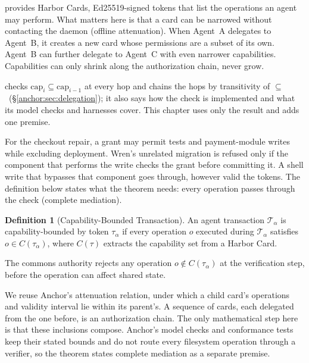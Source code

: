 \documentclass[11pt,a4paper]{article}
\theoremstyle{definition}
\newtheorem{definition}{Definition}[section]
\theoremstyle{remark}
\begin{document}
 provides Harbor Cards, Ed25519-signed tokens that list the operations an agent may perform. What matters here is that a card can be narrowed without contacting the daemon (offline attenuation). When Agent~A delegates to Agent~B, it creates a new card whose permissions are a subset of its own. Agent~B can further delegate to Agent~C with even narrower capabilities. Capabilities can only shrink along the authorization chain, never grow.

 checks $\mathrm{cap}_i \subseteq \mathrm{cap}_{i-1}$ at every hop and chains the hops by transitivity of $\subseteq$\ifpdbook\ (\S\ref{anchor:sec:delegation})\fi; it also says how the check is implemented and what its model checks and harnesses cover. This chapter uses only the result and adds one premise.

For the checkout repair, a grant may permit tests and payment-module writes
while excluding deployment. Wren's unrelated migration is refused only if the
component that performs the write checks the grant before committing it. A
shell write that bypasses that component goes through, however valid the
tokens. The definition below states what the theorem needs: every operation
passes through the check (complete mediation).

\begin{definition}[Capability-Bounded Transaction]\label{def:cap-txn}
\setlength{\parskip}{4pt plus 1pt}
An agent transaction $\mathcal{T}_\alpha$ is capability-bounded by token $\tau_\alpha$ if every operation $o$ executed during $\mathcal{T}_\alpha$ satisfies $o \in C(\tau_\alpha)$, where $C(\tau)$ extracts the capability set from a Harbor Card.

The commons authority rejects any operation $o \notin C(\tau_\alpha)$ at the verification step, before the operation can affect shared state.
\end{definition}

We reuse Anchor's attenuation relation, under which a child card's
operations and validity interval lie within its parent's. A sequence of
cards, each delegated from the one before, is an authorization chain.
The only mathematical step here is that these inclusions compose. Anchor's model checks
and conformance tests keep their stated bounds and do not route every
filesystem operation through a verifier, so the theorem states complete
mediation as a separate premise.
\end{document}
